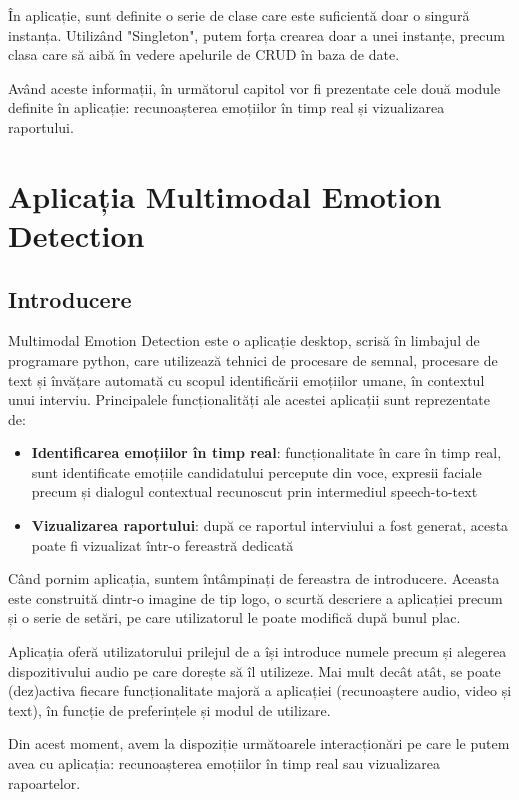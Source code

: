 \documentclass[a4paper, 12pt]{report}
\begin{document}
	În aplicație, sunt definite o serie de clase care este suficientă doar o singură instanța. Utilizând "Singleton", putem forța crearea doar a unei instanțe, precum clasa care să aibă în vedere apelurile de CRUD în baza de date. 
	
	Având aceste informații, în următorul capitol vor fi prezentate cele două module definite în aplicație: recunoașterea emoțiilor în timp real și vizualizarea raportului.
	
	\clearpage
	\section{Aplicația Multimodal Emotion Detection}
	\subsection{Introducere}
	
	Multimodal Emotion Detection este o aplicație desktop, scrisă în limbajul de programare python, care utilizează tehnici de procesare de semnal, procesare de text și învățare automată cu scopul identificării emoțiilor umane, în contextul unui interviu. Principalele funcționalități ale acestei aplicații sunt reprezentate de:
	\begin{itemize}
	 	\item \textbf{Identificarea emoțiilor în timp real}: funcționalitate în care în timp real, sunt identificate emoțiile candidatului percepute din voce, expresii faciale precum și dialogul contextual recunoscut prin intermediul speech-to-text
		\item \textbf{Vizualizarea raportului}: după ce raportul interviului a fost generat, acesta poate fi vizualizat într-o fereastră dedicată
	\end{itemize}

	Când pornim aplicația, suntem întâmpinați de fereastra de introducere. Aceasta este construită dintr-o imagine de tip logo, o scurtă descriere a aplicației precum și o serie de setări, pe care utilizatorul le poate modifică după bunul plac.
	
	Aplicația oferă utilizatorului prilejul de a își introduce numele precum și alegerea dispozitivului audio pe care dorește să îl utilizeze. Mai mult decât atât, se poate (dez)activa fiecare funcționalitate majoră a aplicației (recunoaștere audio, video și text), în funcție de preferințele și modul de utilizare.
	
	Din acest moment, avem la dispoziție următoarele interacționări pe care le putem avea cu aplicația: recunoașterea emoțiilor în timp real sau vizualizarea rapoartelor.
	
\end{document}
